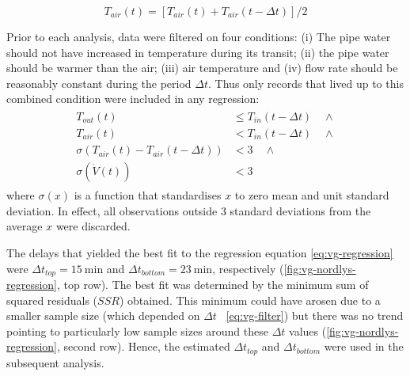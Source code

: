 \begin{equation}
  T_{air}(t)=\left[ T_{air}(t) + T_{air}(t-\Delta t)\right]/2
\end{equation}

Prior to each analysis, data were filtered on four conditions: (i) The pipe water should not have increased in temperature during its transit; (ii) the pipe water should be warmer than the air; (iii) air temperature and (iv) flow rate should be reasonably constant during the period $\Delta t$. Thus only records that lived up to this combined condition were included in any regression:
\begin{align}
\begin{split}
  T_{out}(t) &\leq T_{in}(t-\Delta t)\quad \land \\
  T_{air}(t) &< T_{in}(t-\Delta t)\quad \land \\
  \sigma(T_{air}(t)-T_{air}(t-\Delta t)) &< 3\quad \land \\
  \sigma(\dot{V}(t)) &< 3
  \label{eq:vg-filter}
\end{split}
\end{align}
where $\sigma(x)$ is a function that standardises $x$ to zero mean and unit standard deviation. In effect, all observations outside 3 standard deviations from the average $x$ were discarded.

The delays that yielded the best fit to the regression equation \cref{eq:vg-regression} were $\Delta t_{top}=\SI{15}{\minute}$ and $\Delta t_{bottom}=\SI{23}{\minute}$, respectively (\cref{fig:vg-nordlys-regression}, top row). The best fit was determined by the minimum sum of squared residuals ($SSR$) obtained. This minimum could have arosen due to a smaller sample size (which depended on $\Delta t$ \cf\ \cref{eq:vg-filter}) but there was no trend pointing to particularly low sample sizes around these $\Delta t$ values (\cref{fig:vg-nordlys-regression}, second row). Hence, the estimated $\Delta t_{top}$ and $\Delta t_{bottom}$ were used in the subsequent analysis.

